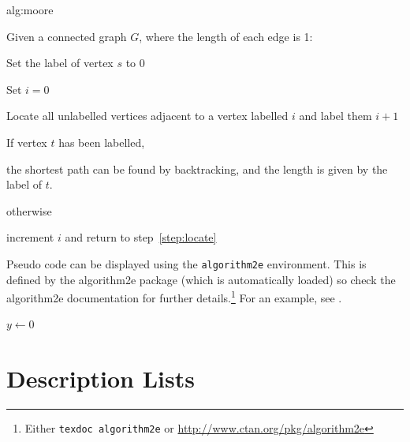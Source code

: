 \documentclass[mlabstract]{jmlr}
\begin{document}
\begin{algorithm}
\floatconts
{alg:moore}%
{\caption{Moore's Shortest Path}}%
{%
Given a connected graph $G$, where the length of each edge is 1:
\begin{enumerate*}
  \item Set the label of vertex $s$ to 0
  \item Set $i=0$
  \begin{enumerate*}
    \item \label{step:locate}Locate all unlabelled vertices 
          adjacent to a vertex labelled $i$ and label them $i+1$
    \item If vertex $t$ has been labelled,
    \begin{enumerate*}
      \item[] the shortest path can be found by backtracking, and 
      the length is given by the label of $t$.
    \end{enumerate*}
    otherwise
    \begin{enumerate*}
      \item[] increment $i$ and return to step~\ref{step:locate}
    \end{enumerate*}
  \end{enumerate*}
\end{enumerate*}
}
\end{algorithm}

Pseudo code can be displayed using the \texttt{algorithm2e}
environment. This is defined by the \textsf{algorithm2e} package
(which is automatically loaded) so check the \textsf{algorithm2e}
documentation for further details.\footnote{Either \texttt{texdoc
algorithm2e} or \url{http://www.ctan.org/pkg/algorithm2e}}
For an example, see .

\begin{algorithm2e}
\caption{Computing Net Activation}
\label{alg:net}
{}
$y\leftarrow 0$\;
\end{algorithm2e}

\section{Description Lists}
\end{document}
